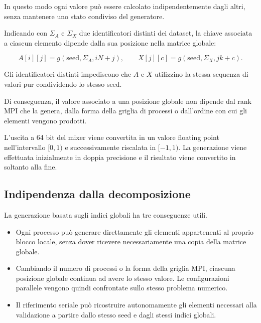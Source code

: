 In questo modo ogni valore può essere calcolato indipendentemente dagli
altri, senza mantenere uno stato condiviso del generatore.

Indicando con $\Sigma_A$ e $\Sigma_X$ due identificatori distinti dei
dataset, la chiave associata a ciascun elemento dipende dalla sua posizione
nella matrice globale:

\begin{equation}
A[i][j]
=
g\!\left(\text{seed},\Sigma_A,iN+j\right),
\qquad
X[j][c]
=
g\!\left(\text{seed},\Sigma_X,jk+c\right).
\label{eq:gen}
\end{equation}

Gli identificatori distinti impediscono che $A$ e $X$ utilizzino la stessa
sequenza di valori pur condividendo lo stesso seed.

Di conseguenza, il valore associato a una posizione globale non dipende
dal rank MPI che la genera, dalla forma della griglia di processi o
dall'ordine con cui gli elementi vengono prodotti.

L'uscita a 64 bit del mixer viene convertita in un valore floating point
nell'intervallo $[0,1)$ e successivamente riscalata in $[-1,1)$.
La generazione viene effettuata inizialmente in doppia precisione e il
risultato viene convertito in  soltanto alla fine.

\subsection{Indipendenza dalla decomposizione}

La generazione basata sugli indici globali ha tre conseguenze utili.

\begin{itemize}
    \item Ogni processo può generare direttamente gli elementi appartenenti
    al proprio blocco locale, senza dover ricevere necessariamente una copia
    della matrice globale.

    \item Cambiando il numero di processi o la forma della griglia MPI,
    ciascuna posizione globale continua ad avere lo stesso valore. Le
    configurazioni parallele vengono quindi confrontate sullo stesso
    problema numerico.

    \item Il riferimento seriale può ricostruire autonomamente gli elementi
    necessari alla validazione a partire dallo stesso seed e dagli stessi
    indici globali.
\end{itemize}

